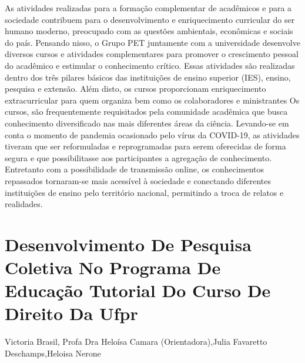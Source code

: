 As atividades realizadas para a formação complementar de acadêmicos e para a sociedade contribuem para o desenvolvimento e enriquecimento curricular do ser humano moderno, preocupado com as questões ambientais, econômicas e sociais do país. Pensando nisso, o Grupo PET juntamente com a universidade desenvolve diversos cursos e atividades complementares para promover o crescimento pessoal do acadêmico e estimular o conhecimento crítico. Essas atividades são realizadas dentro dos três pilares básicos das instituições de ensino superior (IES), ensino, pesquisa e extensão. Além disto, os cursos proporcionam enriquecimento extracurricular para quem organiza bem como os colaboradores e ministrantes Os cursos, são frequentemente requisitados pela comunidade acadêmica que busca conhecimento diversificado nas mais diferentes áreas da ciência. Levando-se em conta o momento de pandemia ocasionado pelo vírus da COVID-19, as atividades tiveram que ser reformuladas e reprogramadas para serem oferecidas de forma segura e que possibilitasse aos participantes a agregação de conhecimento. Entretanto com a possibilidade de transmissão online, os conhecimentos repassados tornaram-se mais acessível à sociedade e conectando diferentes instituições de ensino pelo território nacional, permitindo a troca de relatos e realidades.




\section*{Desenvolvimento De Pesquisa Coletiva No Programa De Educação Tutorial Do Curso De Direito Da Ufpr}

Victoria Brasil, Profa Dra Heloísa Camara (Orientadora),Julia Favaretto Deschamps,Heloisa Nerone


